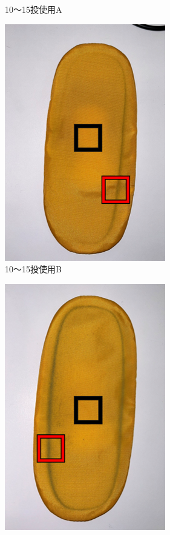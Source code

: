 \documentclass[main]{subfiles}
\begin{document}
\begin{figure}[htbp]
\begin{subfigure}[htbp]{0.3\linewidth}
        \caption{10～15投使用A}
        \label{fig:label}
    \end{subfigure}
    \begin{subfigure}[htbp]{0.3\linewidth}
        \centering
        \includegraphics[keepaspectratio, width=0.8\linewidth, height=\linewidth]{figures/caring_brush_pad/10~15B.png}
        \caption{10～15投使用B}
        \label{fig:label}
    \end{subfigure}
    \begin{subfigure}[htbp]{0.3\linewidth}
        \centering
        \includegraphics[keepaspectratio, width=0.8\linewidth, height=\linewidth]{figures/caring_brush_pad/chouki.png}

\end{subfigure}
\end{figure}
\end{document}
